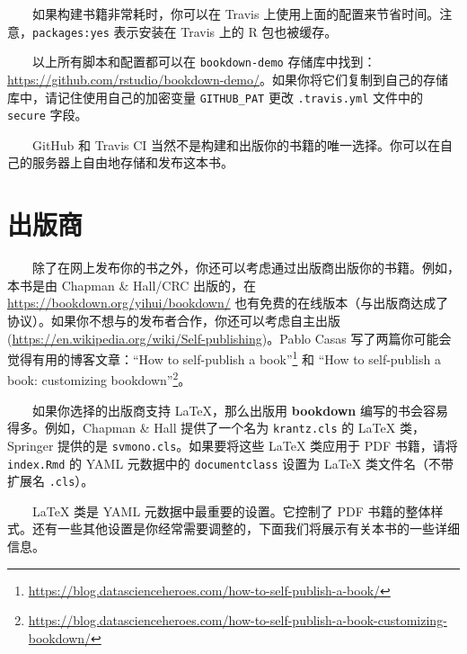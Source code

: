 \documentclass[
  12pt,
]{krantz}
\newenvironment{Shaded}{\begin{snugshade}}{\end{snugshade}}
\newcommand{\AttributeTok}[1]{\textcolor[rgb]{0.77,0.63,0.00}{#1}}
\newcommand{\CharTok}[1]{\textcolor[rgb]{0.31,0.60,0.02}{#1}}
\newcommand{\FunctionTok}[1]{\textcolor[rgb]{0.00,0.00,0.00}{#1}}
\newcommand{\KeywordTok}[1]{\textcolor[rgb]{0.13,0.29,0.53}{\textbf{#1}}}
\renewcommand{\href}[2]{#2\footnote{\url{#1}}}
\theoremstyle{definition}
\theoremstyle{definition}
\theoremstyle{definition}
\theoremstyle{definition}
\theoremstyle{remark}
\begin{document}
\begin{Shaded}
\end{Shaded}

  如果构建书籍非常耗时，你可以在 Travis 上使用上面的配置来节省时间。注意，\texttt{packages:yes} 表示安装在 Travis 上的 R 包也被缓存。

  以上所有脚本和配置都可以在 \texttt{bookdown-demo} 存储库中找到：\url{https://github.com/rstudio/bookdown-demo/}。如果你将它们复制到自己的存储库中，请记住使用自己的加密变量 \texttt{GITHUB\_PAT} 更改 \texttt{.travis.yml} 文件中的 \texttt{secure} 字段。

  GitHub 和 Travis CI 当然不是构建和出版你的书籍的唯一选择。你可以在自己的服务器上自由地存储和发布这本书。

\hypertarget{ux51faux7248ux5546}{%
\section{出版商}\label{ux51faux7248ux5546}}

  除了在网上发布你的书之外，你还可以考虑通过出版商出版你的书籍。例如，本书是由 Chapman \& Hall/CRC 出版的，在 \url{https://bookdown.org/yihui/bookdown/} 也有免费的在线版本（与出版商达成了协议）。如果你不想与的发布者合作，你还可以考虑自主出版 (\url{https://en.wikipedia.org/wiki/Self-publishing})。Pablo Casas 写了两篇你可能会觉得有用的博客文章：\href{https://blog.datascienceheroes.com/how-to-self-publish-a-book/}{``How to self-publish a book''} 和 \href{https://blog.datascienceheroes.com/how-to-self-publish-a-book-customizing-bookdown/}{``How to self-publish a book: customizing bookdown''}。

  如果你选择的出版商支持 LaTeX，那么出版用 \textbf{bookdown} 编写的书会容易得多。例如，Chapman \& Hall 提供了一个名为 \texttt{krantz.cls} 的 LaTeX 类，Springer 提供的是 \texttt{svmono.cls}。如果要将这些 LaTeX 类应用于 PDF 书籍，请将 \texttt{index.Rmd} 的 YAML 元数据中的 \texttt{documentclass} 设置为 LaTeX 类文件名（不带扩展名 \texttt{.cls}）。

  LaTeX 类是 YAML 元数据中最重要的设置。它控制了 PDF 书籍的整体样式。还有一些其他设置是你经常需要调整的，下面我们将展示有关本书的一些详细信息。
\end{document}
